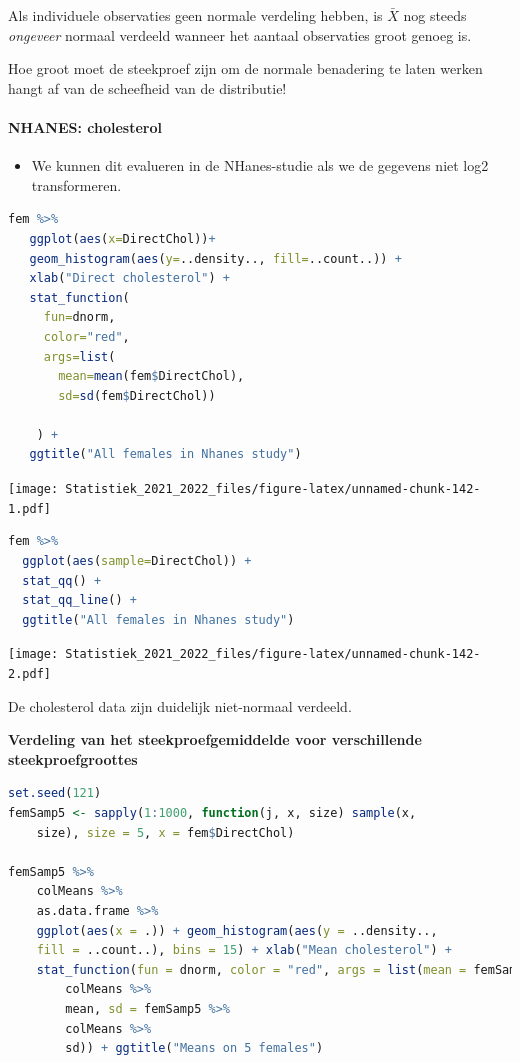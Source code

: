 \documentclass[
  12pt,dutch,coursenotes]{book}
\providecommand{\tightlist}{%
  \setlength{\itemsep}{0pt}\setlength{\parskip}{0pt}}
\theoremstyle{definition}
\theoremstyle{definition}
\theoremstyle{definition}
\theoremstyle{definition}
\theoremstyle{remark}
\begin{document}
Als individuele observaties geen normale verdeling hebben, is \(\bar X\) nog steeds \textit{ongeveer} normaal verdeeld
wanneer het aantaal observaties groot genoeg is.

Hoe groot moet de steekproef zijn om de normale benadering te laten werken hangt af van de scheefheid van de distributie!

\hypertarget{nhanes-cholesterol-1}{%
\paragraph{NHANES: cholesterol}\label{nhanes-cholesterol-1}}

\begin{itemize}
\tightlist
\item
  We kunnen dit evalueren in de NHanes-studie als we de gegevens niet log2 transformeren.
\end{itemize}

\begin{lstlisting}[language=R]
fem %>%
   ggplot(aes(x=DirectChol))+
   geom_histogram(aes(y=..density.., fill=..count..)) +
   xlab("Direct cholesterol") +
   stat_function(
     fun=dnorm,
     color="red",
     args=list(
       mean=mean(fem$DirectChol),
       sd=sd(fem$DirectChol))

    ) +
   ggtitle("All females in Nhanes study")
\end{lstlisting}

\texttt{[image: Statistiek\_2021\_2022\_files/figure-latex/unnamed-chunk-142-1.pdf]}

\begin{lstlisting}[language=R]
 fem %>%
  ggplot(aes(sample=DirectChol)) +
  stat_qq() +
  stat_qq_line() +
  ggtitle("All females in Nhanes study")
\end{lstlisting}

\texttt{[image: Statistiek\_2021\_2022\_files/figure-latex/unnamed-chunk-142-2.pdf]}

De cholesterol data zijn duidelijk niet-normaal verdeeld.

\textbf{Verdeling van het steekproefgemiddelde voor verschillende steekproefgroottes}

\begin{lstlisting}[language=R]
set.seed(121)
femSamp5 <- sapply(1:1000, function(j, x, size) sample(x,
    size), size = 5, x = fem$DirectChol)

femSamp5 %>%
    colMeans %>%
    as.data.frame %>%
    ggplot(aes(x = .)) + geom_histogram(aes(y = ..density..,
    fill = ..count..), bins = 15) + xlab("Mean cholesterol") +
    stat_function(fun = dnorm, color = "red", args = list(mean = femSamp5 %>%
        colMeans %>%
        mean, sd = femSamp5 %>%
        colMeans %>%
        sd)) + ggtitle("Means on 5 females")
\end{lstlisting}
\end{document}
